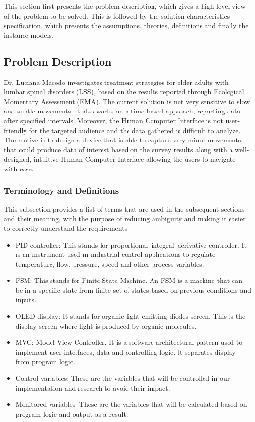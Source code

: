 \documentclass[12pt]{article}
\begin{document}
This section first presents the problem description, which gives a high-level
view of the problem to be solved.  This is followed by the solution characteristics
specification, which presents the assumptions, theories, definitions and finally
the instance models.  

\subsection{Problem Description} \label{Sec_pd}

Dr. Luciana Macedo investigates treatment strategies for older adults with lumbar spinal disorders (LSS), based on the results reported through Ecological Momentary Assessment (EMA).
The current solution is not very sensitive to slow and subtle movements. It also works on a time-based approach, reporting data after specified intervals. Moreover, the Human Computer Interface is not user-friendly for the targeted audience and the data gathered is difficult to analyze.
The motive is to design a device that is able to capture very minor movements, that could produce data of interest based on the survey results along with a well-designed, intuitive Human Computer Interface allowing the users to navigate with ease.

\subsubsection{Terminology and  Definitions}

This subsection provides a list of terms that are used in the subsequent
sections and their meaning, with the purpose of reducing ambiguity and making it
easier to correctly understand the requirements:

\begin{itemize}

  \item PID controller: This stands for proportional–integral–derivative controller. It is an instrument used in industrial control applications to regulate temperature, flow, pressure, speed and other process variables.
  \item FSM: This stands for Finite State Machine. An FSM is a machine that can be in a specific state from finite set of states based on previous conditions and inputs.
  \item OLED display: It stands for organic light-emitting diodes screen. This is the display screen where light is produced by organic molecules.
  \item MVC: Model-View-Controller. It is a software architectural pattern used to implement user interfaces, data and controlling logic. It separates display from program logic.
  \item Control variables: These are the variables that will be controlled in our implementation and research to avoid their impact.
  \item Monitored variables: These are the variables that will be calculated based on program logic and output as a result.

\end{itemize}
\end{document}
